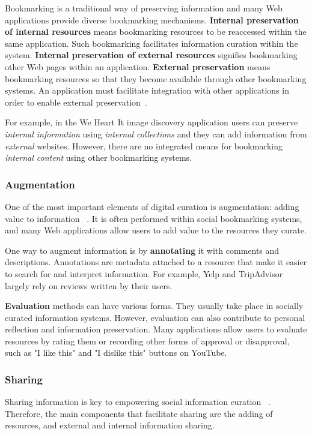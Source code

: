 \documentclass{sigchi}
\begin{document}
{{{{Bookmarking is a traditional way of preserving information and many Web applications provide diverse bookmarking mechanisms. \textbf{Internal preservation of internal resources} means bookmarking resources to be reaccessed within the same application. Such bookmarking facilitates information curation within the system. \textbf{Internal preservation of external resources} signifies bookmarking other Web pages within an application. \textbf{External preservation} means bookmarking resources so that they become available through other bookmarking systems. An application must facilitate integration with other applications in order to enable external preservation~\cite{abrams1998information}.

For example, in the We Heart It image discovery application users can preserve \textit{internal  information} using \textit{internal collections} and they can add information from \textit{external} websites. However, there are no integrated means for bookmarking \textit{internal content} using other bookmarking systems.  
} %

{\subsubsection{Augmentation}
One of the most important elements of digital curation is augmentation: adding value to information ~\cite{beagrie2008digital,whittaker2011personal}. It is often performed within social bookmarking systems, and many Web applications allow users to add value to the resources they curate. 

One way to augment information is by \textbf{annotating} it with comments and descriptions. Annotations are metadata attached to a resource that make it easier to search for and interpret information. For example, Yelp and TripAdvisor largely rely on reviews written by their users. 

\textbf{Evaluation} methods can have various forms. They usually take place in socially curated information systems. However, evaluation can also contribute to personal reflection and information preservation. Many applications allow users to evaluate resources by rating them or recording other forms of approval or disapproval, such as "I like this" and "I dislike this" buttons on YouTube.
} %

{\subsubsection{Sharing}
Sharing information is key to empowering social information curation ~\cite{beagrie2008digital}. Therefore, the main components that facilitate sharing are the adding of resources, and external and internal information sharing.

}}}}
\end{document}
